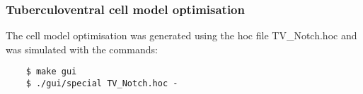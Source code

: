 \newpage
%



\subsubsection[TV cell model]{Tuberculoventral cell model optimisation}    \label{sec:APDX:tuberc-cell-model}

The \TV cell model optimisation was generated using the hoc file \textsf{TV\_Notch.hoc} and was simulated with the commands:
\begin{verbatim}
    $ make gui
    $ ./gui/special TV_Notch.hoc -
\end{verbatim}



